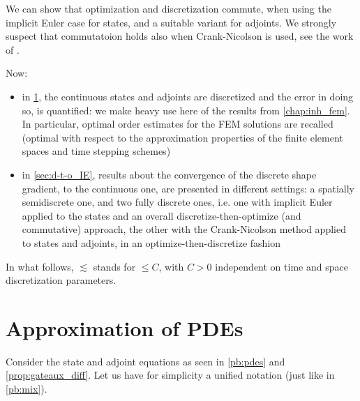 \documentclass[english,a4paper,9pt,oneside]{scrbook}	%
\theoremstyle{break}
\theoremstyle{remark}
\begin{document}
We can show that optimization and discretization commute, when using the implicit Euler case for states, and a suitable variant for adjoints. We strongly suspect that commutatoion holds also when Crank-Nicolson is used, see the work of \cite{flaig}.

Now:

\begin{itemize}
	\item in \cref{sec:o-t-d}, the continuous states and adjoints are discretized and the error in doing so, is quantified: we make heavy use here of the results from \cref{chap:inh_fem}. In particular, optimal order estimates for the FEM solutions are recalled (optimal with respect to the approximation properties of the finite element spaces and time stepping schemes)
	\item in \cref{sec:d-t-o_IE}, results about the convergence of the discrete shape gradient, to the continuous one, are presented in different settings: a spatially semidiscrete one, and two fully discrete ones, i.e. one with implicit Euler applied to the states and an overall discretize-then-optimize (and commutative) approach, the other with the Crank-Nicolson method applied to states and adjoints, in an optimize-then-discretize fashion
\end{itemize}

In what follows, $\lesssim$ stands for $\leq C$, with $C>0$ independent on time and space discretization parameters.

\section{Approximation of PDEs}
\label{sec:o-t-d}

Consider the state and adjoint equations as seen in \cref{pb:pdes} and \cref{prop:gateaux_diff}. Let us have for simplicity a unified notation (just like in \cref{pb:mix}).
\end{document}
